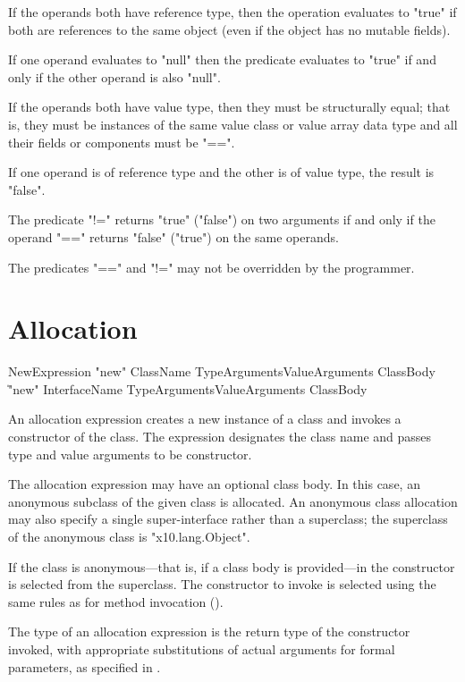 If the operands both have reference type, then the operation
evaluates to \xcd"true" if both are references to
the same object (even if the object has no mutable fields). 

If one operand evaluates to \xcd"null" then the predicate
evaluates to \xcd"true" if and only if the
other operand is also \xcd"null".

If the operands both have value type, then they must be structurally equal;
that is, they must be instances of the same value class or value array
data type and all their fields or components must be \xcd"==". 

If one operand is of reference type and the other is of value type,
the result is \xcd"false".

The predicate \xcd"!=" returns \xcd"true" (\xcd"false") on two
arguments if and only if the operand \xcd"==" returns \xcd"false"
(\xcd"true") on the same operands.

The predicates \xcd"==" and \xcd"!=" may not be overridden by the
programmer.

\section{Allocation}
\label{ClassCreation}

\begin{grammar}
NewExpression \: \xcd"new" ClassName TypeArguments\opt ValueArguments
        ClassBody\opt \\
  \| \xcd"new" InterfaceName TypeArguments\opt ValueArguments
        ClassBody
\end{grammar}

An allocation expression creates a new instance of a class and
invokes a constructor of the class.
The expression designates the class name and passes
type and value arguments to be constructor.

The allocation expression may have an optional class body.
In this case, an anonymous subclass of the given class is
allocated.   An anonymous class allocation may also specify a
single super-interface rather than a superclass; the superclass
of the anonymous class is \xcd"x10.lang.Object".

If the class is anonymous---that is, if a class body is
provided---in the constructor is selected from the superclass.
The constructor to invoke is selected using the same rules as
for method invocation ().

The type of an allocation expression
is the return type of the constructor invoked, with appropriate
substitutions  of actual arguments for formal parameters, as
specified in .

